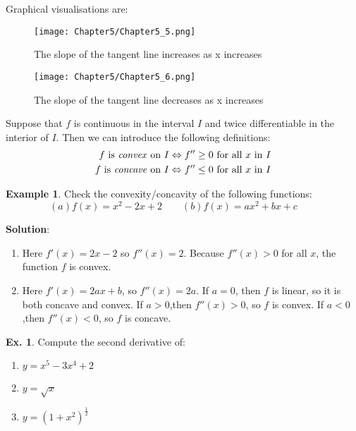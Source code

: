 \documentclass[10pt,a4paper]{book}
\theoremstyle{definition}\newtheorem{definition}{Definition}
\theoremstyle{definition}\newtheorem{fact}{Fact}
\theoremstyle{definition}\newtheorem{ex}{Ex.}
\theoremstyle{definition}\newtheorem{project}{Project}
\theoremstyle{definition}\newtheorem{problem}{Problem}
\theoremstyle{definition}\newtheorem{example}{Example}
\numberwithin{theorem}{chapter}
\numberwithin{corollary}{chapter}
\numberwithin{assumption}{chapter}
\numberwithin{definition}{chapter}
\numberwithin{prop}{chapter}
\numberwithin{notation}{chapter}
\numberwithin{problem}{chapter}
\numberwithin{example}{chapter}
\numberwithin{fact}{chapter}
\numberwithin{ex}{chapter}
\begin{document}
	Graphical visualisations are:
	\begin{figure}[H]
		\centering
		\texttt{[image: Chapter5/Chapter5\_5.png]}
		\caption{The slope of the tangent line increases as x increases}
	\end{figure}
	
	\begin{figure}[H]
		\centering
		\texttt{[image: Chapter5/Chapter5\_6.png]}
		\caption{The slope of the tangent line decreases as x increases}
	\end{figure}
	
	Suppose that $f$ is continuous in the interval $I$ and twice differentiable in the interior of $I$. Then we can introduce the following definitions:
	\begin{align*}
		f \text{ is \textit{convex} on } I  & \Leftrightarrow f'' \geq 0 \text{ for all $x$ in } I \\
		f \text{ is \textit{concave} on } I & \Leftrightarrow f'' \leq 0 \text{ for all $x$ in } I \\
	\end{align*}
	
	\begin{example}
		Check the convexity/concavity of the following functions:
		\begin{equation*}
			(a) f(x)=x^2-2x+2 \qquad
			(b) f(x)=ax^2+bx+c \qquad
		\end{equation*}
		
		\textbf{Solution}:
		\begin{enumerate}[label=(\alph*)]
			\item Here $f'(x) = 2x - 2$ so $f''(x) = 2$. Because $f''(x) > 0$ for all $x$, the function $f$ is convex.
			\item Here $f'(x) = 2ax + b$, so $f''(x) = 2a$. If $a = 0$, then $f$ is linear, so it is both concave and convex. If $a>0$,then $f''(x)>0$, so $f$ is convex. If $a<0$,then $f''(x)<0$, so $f$ is concave.
		\end{enumerate}
	\end{example}
	
	\begin{ex}
		Compute the second derivative of:
		\begin{enumerate}[label=(\alph*)]
			\item $y=x^5-3x^4+2$
			\item $y=\sqrt{x}$
			\item $y=(1+x^2)^{\frac{1}{2}}$
		\end{enumerate}
	\end{ex}
	
\end{document}
